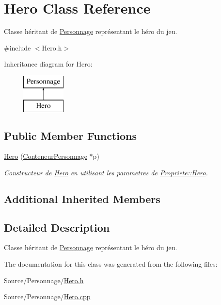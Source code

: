 \hypertarget{classHero}{\section{Hero Class Reference}
\label{classHero}
}


Classe héritant de \hyperlink{classPersonnage}{Personnage} représentant le héro du jeu.  




{\ttfamily \#include $<$Hero.\-h$>$}

Inheritance diagram for Hero\-:\begin{figure}[H]
\begin{center}
\leavevmode
\includegraphics[height=2.000000cm]{classHero}
\end{center}
\end{figure}
\subsection*{Public Member Functions}
\begin{DoxyCompactItemize}
\item 
\hypertarget{classHero_a21158622f34aabee40d2f1e2e143145c}{\hyperlink{classHero_a21158622f34aabee40d2f1e2e143145c}{Hero} (\hyperlink{classConteneurPersonnage}{Conteneur\-Personnage} $\ast$p)}\label{classHero_a21158622f34aabee40d2f1e2e143145c}

\begin{DoxyCompactList}\small\item\em Constructeur de \hyperlink{classHero}{Hero} en utilisant les parametres de \hyperlink{classPropriete_1_1Hero}{Propriete\-::\-Hero}. \end{DoxyCompactList}\end{DoxyCompactItemize}
\subsection*{Additional Inherited Members}


\subsection{Detailed Description}
Classe héritant de \hyperlink{classPersonnage}{Personnage} représentant le héro du jeu. 

The documentation for this class was generated from the following files\-:\begin{DoxyCompactItemize}
\item 
Source/\-Personnage/\hyperlink{Hero_8h}{Hero.\-h}\item 
Source/\-Personnage/\hyperlink{Personnage_2Hero_8cpp}{Hero.\-cpp}\end{DoxyCompactItemize}
